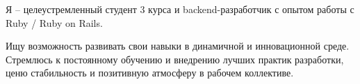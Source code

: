 \par{
Я -- целеустремленный студент 3 курса и backend-разработчик с опытом работы с Ruby / Ruby on Rails.

Ищу возможность развивать свои навыки в динамичной и инновационной среде.
Стремлюсь к постоянному обучению и внедрению лучших практик разработки, ценю стабильность и позитивную атмосферу в рабочем коллективе.
}
\vspace{1em}
